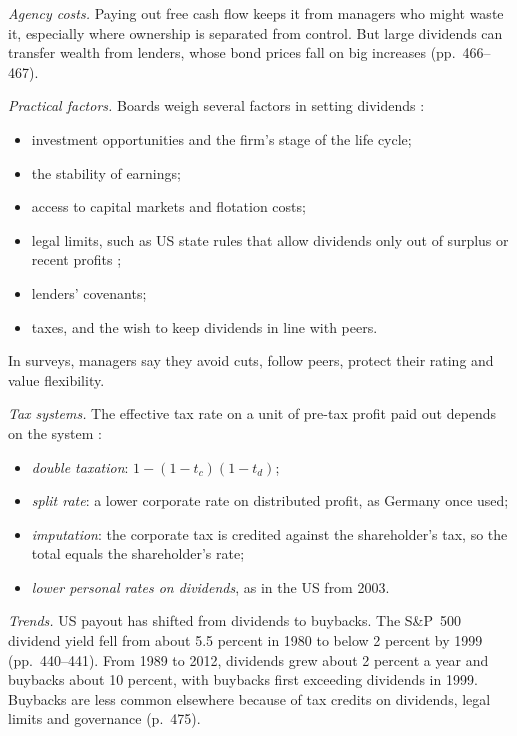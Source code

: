 \begin{qfmethod}
\emph{Agency costs.} Paying out free cash flow keeps it from managers who might waste it, especially where ownership is separated from control. But large dividends can transfer wealth from lenders, whose bond prices fall on big increases (pp.~466--467).

\emph{Practical factors.} Boards weigh several factors in setting dividends \citep[pp.~442--448, 468]{applied-corporate-finance-2014}:
\begin{itemize}
\item investment opportunities and the firm's stage of the life cycle;
\item the stability of earnings;
\item access to capital markets and flotation costs;
\item legal limits, such as US state rules that allow dividends only out of surplus or recent profits \citep[sec.~170(a)]{delaware-gcl-2026};
\item lenders' covenants;
\item taxes, and the wish to keep dividends in line with peers.
\end{itemize}
In surveys, managers say they avoid cuts, follow peers, protect their rating and value flexibility.

\emph{Tax systems.} The effective tax rate on a unit of pre-tax profit paid out depends on the system \citep[pp.~453--454]{applied-corporate-finance-2014}:
\begin{itemize}
\item \emph{double taxation}: $1-(1-t_c)(1-t_d)$;
\item \emph{split rate}: a lower corporate rate on distributed profit, as Germany once used;
\item \emph{imputation}: the corporate tax is credited against the shareholder's tax, so the total equals the shareholder's rate;
\item \emph{lower personal rates on dividends}, as in the US from 2003.
\end{itemize}

\emph{Trends.} US payout has shifted from dividends to buybacks. The S\&P~500 dividend yield fell from about 5.5 percent in 1980 to below 2 percent by 1999 (pp.~440--441). From 1989 to 2012, dividends grew about 2 percent a year and buybacks about 10 percent, with buybacks first exceeding dividends in 1999. Buybacks are less common elsewhere because of tax credits on dividends, legal limits and governance (p.~475).


\end{qfmethod}
